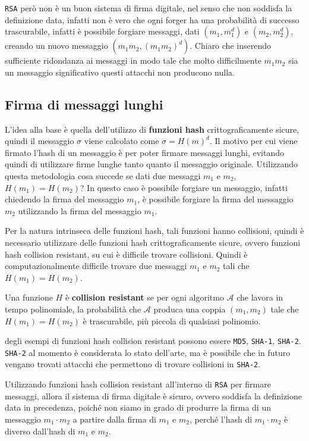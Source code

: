 \texttt{RSA} però non è un buon sistema di firma digitale, nel senso che non soddisfa la definizione data, 
infatti non è vero che ogni forger ha una probabilità di successo trascurabile, infatti è possibile forgiare
messaggi, dati $(m_1, m_1^d)$ e $(m_2, m_2^d)$, creando un nuovo messaggio $(m_1m_2, (m_1m_2)^d)$. Chiaro che 
inserendo sufficiente ridondanza ai messaggi in modo tale che molto difficilmente $m_1m_2$ sia un messaggio significativo 
questi attacchi non producono nulla.

\subsection{Firma di messaggi lunghi}
L'idea alla base è quella dell'utilizzo di \textbf{funzioni hash} crittograficamente sicure, quindi 
il messaggio $\sigma$ viene calcolato come $\sigma = H(m)^d$. Il motivo per cui viene firmato l'hash 
di un messaggio è per poter firmare messaggi lunghi, evitando quindi di utilizzare firme lunghe tanto 
quanto il messaggio originale. Utilizzando questa metodologia cosa succede se dati due messaggi 
$m_1$ e $m_2$, $H(m_1) = H(m_2)$? In questo caso è possibile forgiare un messaggio, infatti 
chiedendo la firma del messaggio $m_1$, è possibile forgiare la firma del messaggio $m_2$ utilizzando 
la firma del messaggio $m_1$.

Per la natura intrinseca delle funzioni hash, tali funzioni hanno collisioni, quindi è necessario
utilizzare delle funzioni hash crittograficamente sicure, ovvero funzioni hash collision resistant, 
su cui è difficile trovare collisioni. Quindi è computazionalmente difficile trovare due messaggi
$m_1$ e $m_2$ tali che $H(m_1) = H(m_2)$.
\begin{tcolorbox}[title = Funzione collision resistant]
  Una funzione $H$ è \textbf{collision resistant} se per ogni algoritmo $\mathcal{A}$ che lavora in tempo 
  polinomiale, la probabilità che $\mathcal{A}$ produca una coppia $(m_1, m_2)$ tale che $H(m_1) = H(m_2)$ 
  è trascurabile, più piccola di qualsiasi polinomio.
\end{tcolorbox}
degli esempi di funzioni hash collision resistant possono essere \texttt{MD5}, \texttt{SHA-1}, \texttt{SHA-2}.
\texttt{SHA-2} al momento è considerata lo stato dell'arte, ma è possibile che in futuro vengano 
trovati attacchi che permettono di trovare collisioni in \texttt{SHA-2}.

Utilizzando funzioni hash collision resistant all'interno di \texttt{RSA} per firmare messaggi, 
allora il sistema di firma digitale è sicuro, ovvero soddisfa la definizione data in precedenza, poiché 
non siamo in grado di produrre la firma di un messaggio $m_1 \cdot m_2$ a partire dalla firma di $m_1$
e $m_2$, perché l'hash di $m_1 \cdot m_2$ è diverso dall'hash di $m_1$ e $m_2$.

